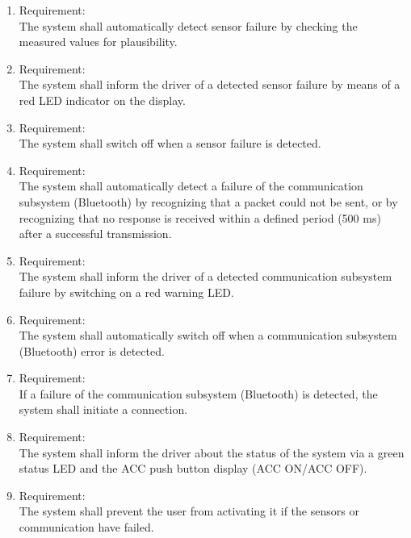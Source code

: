 \begin{enumerate}[label*=\arabic*.]
        \item \label{req.2} Requirement: \\
        The system shall automatically detect sensor failure by checking the measured values for plausibility.  \\
	 	\item \label{req.3} Requirement: \\
        The system shall inform the driver of a detected sensor failure by means of a red LED indicator on the display. \\
        \item \label{req.4} Requirement: \\
        The system shall switch off when a sensor failure is detected. \\
        \item \label{req.5} Requirement: \\
        The system shall automatically detect a failure of the communication subsystem (Bluetooth) by recognizing that a packet could not be sent, or by recognizing that no response is received within a defined period (500 ms) after a successful transmission. \\
        \item \label{req.6} Requirement: \\
        The system shall inform the driver of a detected communication subsystem failure by switching on a red warning LED. \\
        \item \label{req.7} Requirement: \\
        The system shall automatically switch off when a communication subsystem (Bluetooth) error is detected. \\
        \item \label{req.8} Requirement: \\
        If a failure of the communication subsystem (Bluetooth) is detected, the system shall initiate a connection. \\
        \item \label{req.9} Requirement: \\
        The system shall inform the driver about the status of the system via a green status LED and the ACC push button display (ACC ON/ACC OFF). \\
        \item \label{req.10} Requirement: \\
        The system shall prevent the user from activating it if the sensors or communication have failed. \\

\end{enumerate}
